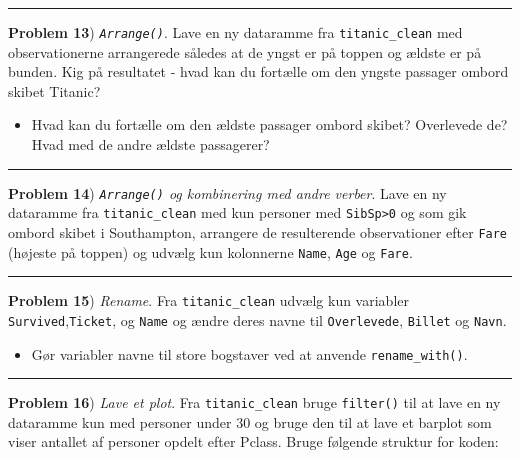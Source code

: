 \documentclass[
]{book}
\providecommand{\tightlist}{%
  \setlength{\itemsep}{0pt}\setlength{\parskip}{0pt}}
\begin{document}
\begin{center}\rule{0.5\linewidth}{0.5pt}\end{center}

\textbf{Problem 13}) \emph{\texttt{Arrange()}}. Lave en ny dataramme fra \texttt{titanic\_clean} med observationerne arrangerede således at de yngst er på toppen og ældste er på bunden. Kig på resultatet - hvad kan du fortælle om den yngste passager ombord skibet Titanic?

\begin{itemize}
\tightlist
\item
  Hvad kan du fortælle om den ældste passager ombord skibet? Overlevede de? Hvad med de andre ældste passagerer?
\end{itemize}

\begin{center}\rule{0.5\linewidth}{0.5pt}\end{center}

\textbf{Problem 14}) \emph{\texttt{Arrange()} og kombinering med andre verber}. Lave en ny dataramme fra \texttt{titanic\_clean} med kun personer med \texttt{SibSp\textgreater{}0} og som gik ombord skibet i Southampton, arrangere de resulterende observationer efter \texttt{Fare} (højeste på toppen) og udvælg kun kolonnerne \texttt{Name}, \texttt{Age} og \texttt{Fare}.

\begin{center}\rule{0.5\linewidth}{0.5pt}\end{center}

\textbf{Problem 15}) \emph{Rename}. Fra \texttt{titanic\_clean} udvælg kun variabler \texttt{Survived},\texttt{Ticket}, og \texttt{Name} og ændre deres navne til \texttt{Overlevede}, \texttt{Billet} og \texttt{Navn}.

\begin{itemize}
\tightlist
\item
  Gør variabler navne til store bogstaver ved at anvende \texttt{rename\_with()}.
\end{itemize}

\begin{center}\rule{0.5\linewidth}{0.5pt}\end{center}

\textbf{Problem 16}) \emph{Lave et plot}. Fra \texttt{titanic\_clean} bruge \texttt{filter()} til at lave en ny dataramme kun med personer under 30 og bruge den til at lave et barplot som viser antallet af personer opdelt efter Pclass. Bruge følgende struktur for koden:
\end{document}
